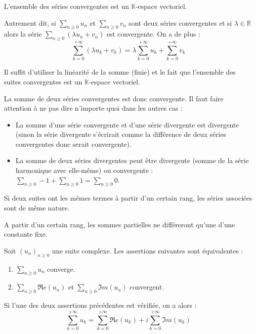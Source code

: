 \documentclass[french,11pt,twoside]{VcCours}
\newcommand{\Sum}[2]{\ensuremath{\textstyle{\sum\limits_{#1}^{#2}}}}
\begin{document}
\begin{Proposition}{}
L'ensemble des séries convergentes est un $\mathbb{K}$-espace vectoriel.

Autrement dit, si $\Sum{n \geq 0}{} u_n$ et $\Sum{n \geq 0}{} v_n$ sont deux séries convergentes et si $\lambda \in \mathbb{R}$ alors la série $\Sum{n \geq 0}{} (\lambda u_n +v_n)$ est convergente. On a de plus : 
$$ \sum_{k=0}^{+ \infty} (\lambda u_k + v_k) = \lambda  \sum_{k=0}^{+ \infty}  u_k +  \sum_{k=0}^{+ \infty}  v_k$$
\end{Proposition}

\begin{Demonstration}{}
Il suffit d'utiliser la linéarité de la somme (finie) et le fait que l'ensemble des suites convergentes est un $\mathbb{K}$-espace vectoriel.
\end{Demonstration}

\begin{Remarque}{} La somme de deux séries convergentes est donc convergente. Il faut faire attention à ne pas dire n'importe quoi dans les autres cas :
\begin{itemize}
\item La somme d'une série convergente et d'une série divergente est divergente (sinon la série divergente s'écrirait comme la différence de deux séries convergentes donc serait convergente).
\item La somme de deux séries divergentes peut être divergente (somme de la série harmonique avec elle-même) ou convergente :  $\Sum{n \geq 0}{} - 1 +  \Sum{n \geq 0}{} 1 = \Sum{n \geq 0}{} 0.$
\end{itemize}
\end{Remarque}

\begin{Proposition}{} Si deux suites ont les mêmes termes à partir d'un certain rang, les séries associées sont de même nature.
\end{Proposition}

\begin{Demonstration}{}
A partir d'un certain rang, les sommes partielles ne différeront qu'une d'une constante fixe.
\end{Demonstration}

\begin{Proposition}{}\label{ConvSerCompl}
Soit $(u_n)_{n \geq 0}$ une suite complexe. Les assertions suivantes sont équivalentes :

\begin{enumerate}
\item $\Sum{n \geq 0}{} u_n$ converge.
\item $\Sum{n \geq 0}{} \Re e(u_n)$ et $\Sum{n \geq 0}{} \Im m(u_n)$ convergent.
\end{enumerate}
Si l'une des deux assertions précédentes est vérifiée, on a alors :
$$ \sum_{k=0}^{+ \infty} u_k = \sum_{k=0}^{+ \infty} \Re e(u_k) + i \sum_{k=0}^{+ \infty} \Im m(u_k)$$
\end{Proposition}
\end{document}
